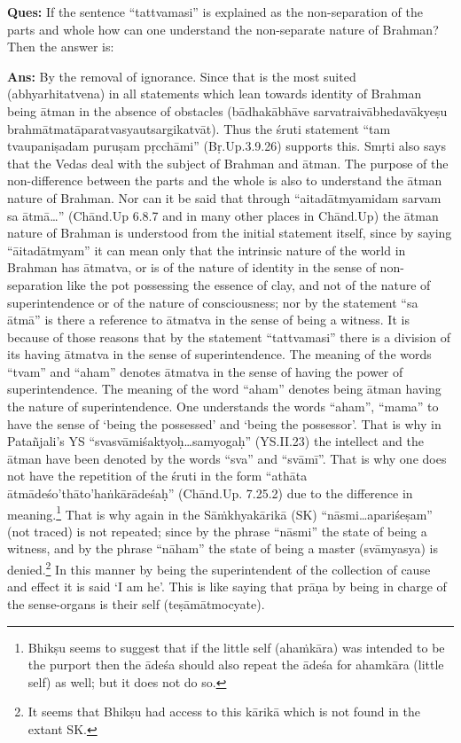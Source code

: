 \textbf{Ques:} If the sentence “tattvamasi” is explained as the non-separation of the parts and whole how can one understand the non-separate nature of Brahman? Then the answer is: 

\textbf{Ans:} By the removal of ignorance. Since that is the most suited (abhyarhitatvena) in all statements which lean towards identity of Brahman being ātman in the absence of obstacles (bādhakābhāve sarvatraivābhedavākyeṣu brahmātmatāparatvasyautsargikatvāt). Thus the śruti statement “tam tvaupaniṣadam puruṣam pṛcchāmi” (Bṛ.Up.3.9.26) supports this. Smṛti also says that the Vedas deal with the subject of Brahman and ātman. The purpose of the non-difference between the parts and the whole is also to understand the ātman nature of Brahman. Nor can it be said that through “aitadātmyamidam sarvam sa ātmā…” (Chānd.Up 6.8.7 and in many other places in Chānd.Up) the ātman nature of Brahman is understood from the initial statement itself, since by saying “āitadātmyam” it can mean only that the intrinsic nature of the world in Brahman has ātmatva, or is of the nature of identity in the sense of non-separation like the pot possessing the essence of clay, and not of the nature of superintendence or of the nature of consciousness; nor by the statement “sa ātmā” is there a reference to ātmatva in the sense of being a witness. It is because of those reasons that by the statement “tattvamasi” there is a division of its having ātmatva in the sense of superintendence. The meaning of the words “tvam” and “aham” denotes ātmatva in the sense of having the power of superintendence. The meaning of the word “aham” denotes being ātman having the nature of superintendence. One understands the words “aham”, “mama” to have the sense of ‘being the possessed’ and ‘being the possessor’. That is why in Patañjali’s YS “svasvāmiśaktyoḥ…samyogaḥ” (YS.II.23) the intellect and the ātman have been denoted by the words “sva” and “svāmī”. That is why one does not have the repetition of the śruti in the form “athāta ātmādeśo’thāto’haṅkārādeśaḥ” (Chānd.Up. 7.25.2) due to the difference in meaning.\footnote{Bhikṣu seems to suggest that if the little self (ahaṁkāra) was intended to be the purport then the ādeśa should also repeat the ādeśa for ahamkāra (little self) as well; but it does not do so.} That is why again in the Sāṁkhyakārikā (SK) “nāsmi…\-apariśeṣam” (not traced) is not repeated; since by the phrase “nāsmi” the state of being a witness, and by the phrase “nāham” the state of being a master (svāmyasya) is denied.\footnote{It seems that Bhikṣu had access to this kārikā which is not found in the extant SK.} In this manner by being the superintendent of the collection of cause and effect it is said ‘I am he’. This is like saying that prāṇa by being in charge of the sense-organs is their self (teṣāmātmocyate). 

